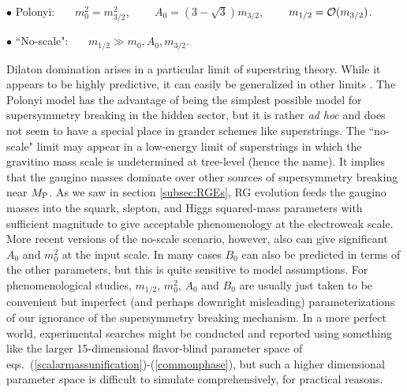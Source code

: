 \documentclass[11pt]{article}
\def\MPlanck{M_{\rm P}}
\begin{document}
$\bullet$
Polonyi: \cite{polonyi}
{}~~~$m^2_0 = m^2_{3/2}$,
{}~~~~$A_0 = (3 -{\sqrt 3}) m_{3/2}$,
{}~~~~$m_{1/2} = {\cal O}(m_{3/2})$.

\vspace{.08in}

$\bullet$ ``No-scale": \cite{noscale}~~~$m_{1/2} \gg
m_0, A_0, m_{3/2}$.

\vspace{.1in}

\noindent Dilaton domination arises in a particular limit of 
superstring theory. While it appears to be highly predictive, it can 
easily be generalized in other limits \cite{stringsoft}. The Polonyi model 
has the advantage of being the simplest possible model for supersymmetry 
breaking in the hidden sector, but it is rather {\it ad hoc} and does not 
seem to have a special place in grander schemes like superstrings. The 
``no-scale" limit may appear in a low-energy limit of superstrings in which 
the gravitino mass scale is undetermined at tree-level (hence the name). 
It implies that the gaugino masses dominate over other sources of 
supersymmetry breaking near $\MPlanck$. As we saw in section 
\ref{subsec:RGEs}, RG evolution feeds the gaugino masses into the squark, slepton, 
and Higgs squared-mass parameters with sufficient magnitude to give 
acceptable phenomenology at the electroweak scale. More recent versions of 
the no-scale scenario, however, also can give significant $A_0$ and 
$m_0^2$ at the input scale. In many cases $B_0$ can also be predicted in terms 
of the other parameters, but this is quite sensitive to model assumptions. 
For phenomenological studies, $m_{1/2}$, $m_0^2$, $A_0$ and $B_0$ are 
usually just taken to be convenient but imperfect (and perhaps 
downright misleading) parameterizations 
of our ignorance of the supersymmetry breaking mechanism.
In a more perfect world, experimental searches might be conducted and reported
using something like the larger 15-dimensional flavor-blind parameter 
space of eqs.~(\ref{scalarmassunification})-(\ref{commonphase}), 
but such a higher dimensional parameter space is difficult 
to simulate comprehensively,
for practical reasons.
\end{document}

